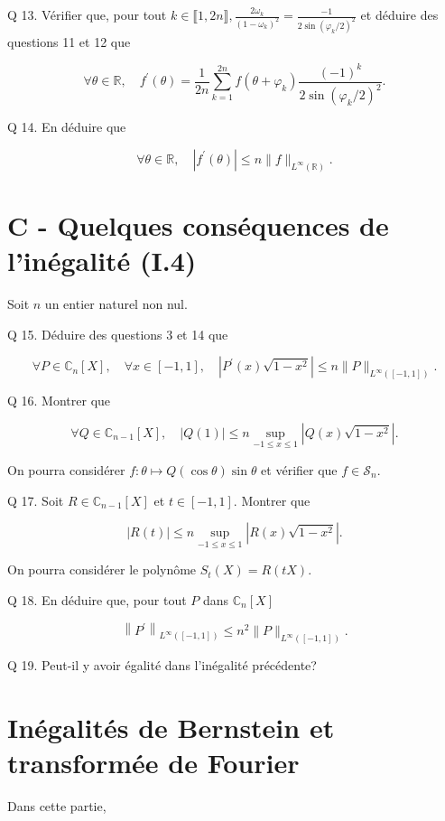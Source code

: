\documentclass[10pt]{article}
\begin{document}
Q 13. Vérifier que, pour tout $k \in \llbracket 1,2 n \rrbracket, \frac{2 \omega_{k}}{\left(1-\omega_{k}\right)^{2}}=\frac{-1}{2 \sin \left(\varphi_{k} / 2\right)^{2}}$ et déduire des questions 11 et 12 que

$$
\forall \theta \in \mathbb{R}, \quad f^{\prime}(\theta)=\frac{1}{2 n} \sum_{k=1}^{2 n} f\left(\theta+\varphi_{k}\right) \frac{(-1)^{k}}{2 \sin \left(\varphi_{k} / 2\right)^{2}} .
$$

Q 14. En déduire que

$$
\forall \theta \in \mathbb{R}, \quad\left|f^{\prime}(\theta)\right| \leqslant n\|f\|_{L^{\infty}(\mathbb{R})} .
$$

\section{C - Quelques conséquences de l'inégalité (I.4)}
Soit $n$ un entier naturel non nul.

Q 15. Déduire des questions 3 et 14 que

$$
\forall P \in \mathbb{C}_{n}[X], \quad \forall x \in[-1,1], \quad\left|P^{\prime}(x) \sqrt{1-x^{2}}\right| \leqslant n\|P\|_{L^{\infty}([-1,1])} .
$$

Q 16. Montrer que

$$
\forall Q \in \mathbb{C}_{n-1}[X], \quad|Q(1)| \leqslant n \sup _{-1 \leqslant x \leqslant 1}\left|Q(x) \sqrt{1-x^{2}}\right| .
$$

On pourra considérer $f: \theta \mapsto Q(\cos \theta) \sin \theta$ et vérifier que $f \in \mathcal{S}_{n}$.

Q 17. Soit $R \in \mathbb{C}_{n-1}[X]$ et $t \in[-1,1]$. Montrer que

$$
|R(t)| \leqslant n \sup _{-1 \leqslant x \leqslant 1}\left|R(x) \sqrt{1-x^{2}}\right| .
$$

On pourra considérer le polynôme $S_{t}(X)=R(t X)$.

Q 18. En déduire que, pour tout $P$ dans $\mathbb{C}_{n}[X]$

$$
\left\|P^{\prime}\right\|_{L^{\infty}([-1,1])} \leqslant n^{2}\|P\|_{L^{\infty}([-1,1])} .
$$

Q 19. Peut-il y avoir égalité dans l'inégalité précédente?

\section{Inégalités de Bernstein et transformée de Fourier}
Dans cette partie,
\end{document}
